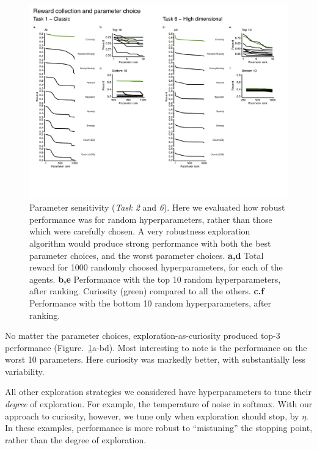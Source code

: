 \begin{figure}
	\includegraphics[width=11.4cm]{img/robust.pdf} 
	\caption{Parameter sensitivity (\textit{Task 2} and \textit{6}). Here we evaluated how robust performance was for random hyperparameters, rather than those which were carefully chosen. A very robustness exploration algorithm would produce strong performance with both the best parameter choices, and the worst parameter choices. 
	\textbf{a,d} Total reward for 1000 randomly choosed hyperparameters, for each of the agents.
	\textbf{b,e} Performance with the top 10 random hyperparameters, after ranking. Curiosity (green) compared to all the others.
	\textbf{c.f} Performance with the bottom 10 random hyperparameters, after ranking.
	}
	\label{fig:robust}
\end{figure}

No matter the parameter choices, exploration-as-curiosity produced top-3 performance (Figure.~\ref{fig:robust}a-bd). Most interesting to note is the performance on the worst 10 parameters. Here curiosity was markedly better, with substantially less variability.

All other exploration strategies we considered have hyperparameters to tune their \emph{degree} of exploration. For example, the temperature of noise in softmax. With our approach to curiosity, however, we tune only when exploration should stop, by $\eta$. In these examples, performance is more robust to  ``mistuning'' the stopping point, rather than the degree of exploration.
